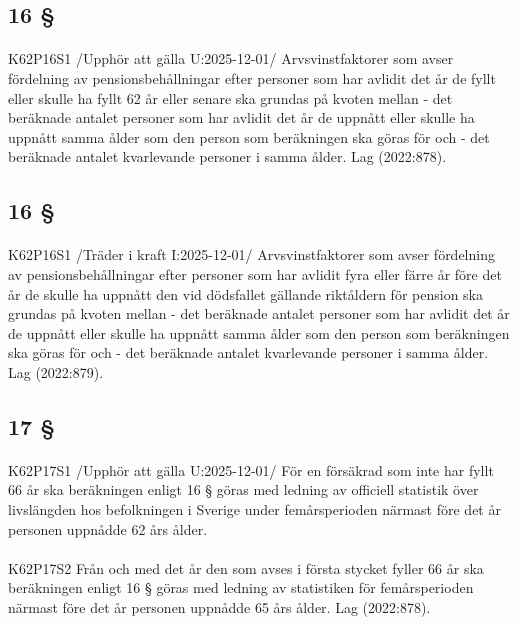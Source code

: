 \documentclass[a4paper,notitlepage,openany,10pt]{book}
\begin{document}
\subsection*{16 §}
\paragraph*{}
{\tiny K62P16S1}
/Upphör att gälla U:2025-12-01/
Arvsvinstfaktorer som avser fördelning av pensionsbehållningar efter personer som har avlidit det år de fyllt eller skulle ha fyllt 62 år eller senare ska grundas på kvoten mellan
\newline - det beräknade antalet personer som har avlidit det år de uppnått eller skulle ha uppnått samma ålder som den person som beräkningen ska göras för och
\newline - det beräknade antalet kvarlevande personer i samma ålder.
Lag (2022:878).
\subsection*{16 §}
\paragraph*{}
{\tiny K62P16S1}
/Träder i kraft I:2025-12-01/
Arvsvinstfaktorer som avser fördelning av pensionsbehållningar efter personer som har avlidit fyra eller färre år före det år de skulle ha uppnått den vid dödsfallet gällande riktåldern för pension ska grundas på kvoten mellan
\newline - det beräknade antalet personer som har avlidit det år de uppnått eller skulle ha uppnått samma ålder som den person som beräkningen ska göras för och
\newline - det beräknade antalet kvarlevande personer i samma ålder.
Lag (2022:879).
\subsection*{17 §}
\paragraph*{}
{\tiny K62P17S1}
/Upphör att gälla U:2025-12-01/
För en försäkrad som inte har fyllt 66 år ska beräkningen enligt 16 § göras med ledning av officiell statistik över livslängden hos befolkningen i Sverige under femårsperioden närmast före det år personen uppnådde 62 års ålder.
\paragraph*{}
{\tiny K62P17S2}
Från och med det år den som avses i första stycket fyller 66 år ska beräkningen enligt 16 § göras med ledning av statistiken för femårsperioden närmast före det år personen uppnådde 65 års ålder.
Lag (2022:878).
\end{document}
